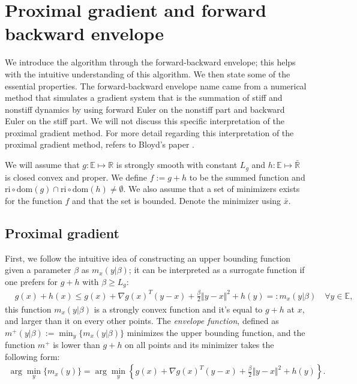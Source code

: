 \documentclass[]{article}
\theoremstyle{definition}
\begin{document}
\section{Proximal gradient and forward backward envelope}\label{sec:pg_forward_backward_env}
    We introduce the algorithm through the forward-backward envelope; this helps with the intuitive understanding of this algorithm. We then state some of the essential properties. The forward-backward envelope name came from a numerical method that simulates a gradient system that is the summation of stiff and nonstiff dynamics by using forward Euler on the nonstiff part and backward Euler on the stiff part. We will not discuss this specific interpretation of the proximal gradient method. For more detail regarding this interpretation of the proximal gradient method, refers to Bloyd's paper \cite{paper:bloyd}. 
    \begin{assumption}\label{assumption:1}
        We will assume that $g:\mathbb E\mapsto \mathbb R$ is strongly smooth with constant $L_g$ and $h:\mathbb E \mapsto \bar{\mathbb R}$ is closed convex and proper. We define $f := g + h$ to be the summed function and $\text{ri}\circ \text{dom}(g) \cap \text{ri}\circ \text{dom}(h) \neq \emptyset$. We also assume that a set of minimizers exists for the function $f$ and that the set is bounded. Denote the minimizer using $\bar x$. 
    \end{assumption}
    
    \subsection{Proximal gradient}
        First, we follow the intuitive idea of constructing an upper bounding function given a parameter $\beta$ as  $m_x(y|\beta)$; it can be interpreted as a surrogate function if one prefers for $g + h$ with $\beta \ge L_g$: 
        \begin{align*}
            & g(x) + h(x) \le 
            g(x) + \nabla g(x)^T(y - x) + \frac{\beta}{2} \Vert y - x\Vert^2
            + h(y) =: m_x(y|\beta) \quad \forall y \in \mathbb E, 
        \end{align*}
        this function $m_x(y|\beta)$ is a strongly convex function and it's equal to $g + h$ at $x$, and larger than it on every other points. The \emph{envelope function}, defined as $m^+(y|\beta):= \min_y \{m_x(y|\beta)\}$ minimizes the upper bounding function, and the function $m^+$ is lower than $g + h$ on all points and its minimizer takes the following form: 
        \begin{align*}
            \arg\min_{y} \{m_x(y)\} 
            = \arg\min_{y}\left\lbrace
                g(x) + \nabla g(x)^T(y - x) + \frac{\beta}{2}
                \Vert y - x\Vert^2 + h(y) 
            \right\rbrace. 
        \end{align*}
        
\end{document}

